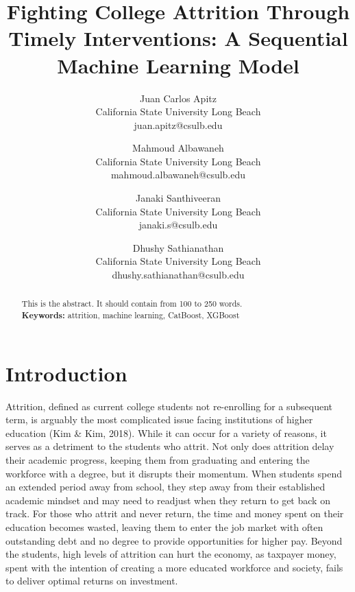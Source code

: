 \documentclass[notitlepage,12pt]{jedm}
\begin{document}
\title{Fighting College Attrition Through Timely Interventions: A Sequential Machine Learning Model}
\date{} %

\author{{\large Juan Carlos Apitz}\\California State University Long Beach \\juan.apitz@csulb.edu \and {\large Mahmoud Albawaneh }\\California State University Long Beach \\mahmoud.albawaneh@csulb.edu  \and {\large Janaki Santhiveeran }\\California State University Long Beach \\janaki.s@csulb.edu \and {\large Dhushy Sathianathan }\\California State University Long Beach \\dhushy.sathianathan@csulb.edu}

\maketitle

\begin{abstract}
This is the abstract. It should contain from 100 to 250 words.\\ %

{\parindent0pt
\textbf{Keywords:} attrition, machine learning, CatBoost, XGBoost
}
\end{abstract}


\section{Introduction}

\par Attrition, defined as current college students not re-enrolling for a subsequent term, is arguably the most complicated issue facing institutions of higher education (Kim \& Kim, 2018). While it can occur for a variety of reasons, it serves as a detriment to the students who attrit. Not only does attrition delay their academic progress, keeping them from graduating and entering the workforce with a degree, but it disrupts their momentum. When students spend an extended period away from school, they step away from their established academic mindset and may need to readjust when they return to get back on track. For those who attrit and never return, the time and money spent on their education becomes wasted, leaving them to enter the job market with often outstanding debt and no degree to provide opportunities for higher pay. Beyond the students, high levels of attrition can hurt the economy, as taxpayer money, spent with the intention of creating a more educated workforce and society, fails to deliver optimal returns on investment. 
\end{document}
